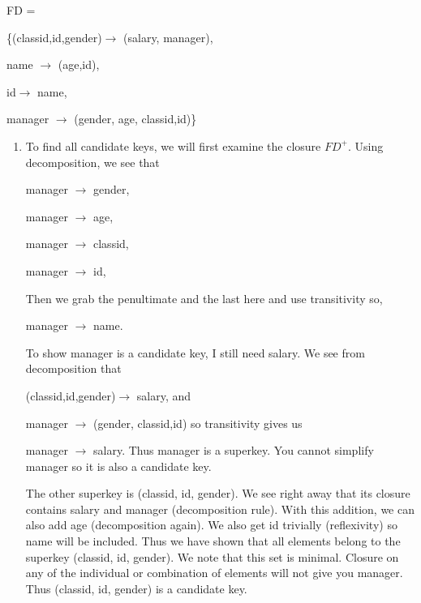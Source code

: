 \documentclass[11pt]{article}
\begin{document}
\begin{enumerate}
FD = 

\{(classid,id,gender)$\rightarrow$ (salary, manager),

name $\rightarrow$ (age,id), 

id$\rightarrow$ name, 

manager $\rightarrow$ (gender, age, classid,id)\}
\begin{enumerate}
\item To find all candidate keys, we will first examine the closure $FD^+$.  Using decomposition, we see that 

manager $\rightarrow$ gender,

manager $\rightarrow$ age,

manager $\rightarrow$ classid,

manager $\rightarrow$ id,

Then we grab the penultimate and the last here and use transitivity so,

manager $\rightarrow$ name.

To show manager is a candidate key, I still need salary.  We see from decomposition that 

(classid,id,gender)$\rightarrow$ salary, and

manager $\rightarrow$ (gender, classid,id) so transitivity gives us

manager $\rightarrow$ salary.  Thus manager is a superkey.  You cannot simplify manager so it is also a candidate key.

The other superkey is (classid, id, gender).  We see right away that its closure contains salary and manager (decomposition rule).  With this addition, we can also add age (decomposition again).  We also get id trivially (reflexivity) so name will be included.  Thus we have shown that all elements belong to the superkey (classid, id, gender).  We note that this set is minimal.  Closure on any of the individual or combination of elements will not give you manager.  Thus (classid, id, gender) is a candidate key.


\end{enumerate}
\end{enumerate}
\end{document}
